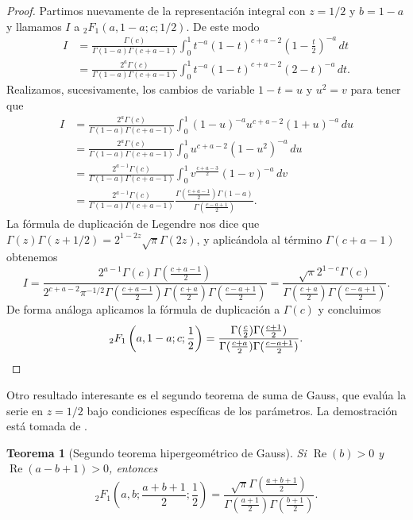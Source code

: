 \documentclass[12pt,a4paper]{book}
\renewcommand{\Re}{\operatorname{Re}}
\newtheorem{theorem}{Teorema}
\begin{document}
\begin{proof}
Partimos nuevamente de la representación integral con $z=1/2$ y $b=1-a$ y llamamos $I$ a ${}_{2}F_{1}(a,1-a;c;1/2)$. De este modo
\begin{align*}
   I &= 
   \frac{\Gamma(c)}{\Gamma(1-a)\Gamma(c+a-1)} \int_0^1 t^{-a} (1-t)^{c+a-2} \left(1-\frac{t}{2}\right)^{-a} \, dt \\ 
   &= \frac{2^a \Gamma(c)}{\Gamma(1-a)\Gamma(c+a-1)}\int_0^1 t^{-a} (1-t)^{c+a-2} (2-t)^{-a} \, dt.
\end{align*}
Realizamos, sucesivamente, los cambios de variable $1 - t = u$ y $u^2 = v$ para tener que 
\begin{align*}
   I &= 
   \frac{2^a \Gamma(c)}{\Gamma(1-a)\Gamma(c+a-1)} \int_0^1 (1-u)^{-a} u^{c+a-2} (1+u)^{-a} \, du \\ 
   &= \frac{2^a \Gamma(c)}{\Gamma(1-a)\Gamma(c+a-1)} \int_0^1 u^{c+a-2} (1-u^2)^{-a} \, du \\
   &= \frac{2^{a-1} \Gamma(c)}{\Gamma(1-a)\Gamma(c+a-1)} \int_0^1 v^{\frac{c+a-3}{2}} (1-v)^{-a} \, dv \\ 
   &= \frac{ 2^{a-1}\Gamma(c)}{\Gamma(1-a)\Gamma(c+a-1)} \frac{\Gamma(\frac{c+a-1}{2})\Gamma(1-a)}{\Gamma(\frac{c-a+1}{2})}.
\end{align*}
La fórmula de duplicación de Legendre nos dice que $\Gamma(z)\Gamma(z+1/2) = 2^{1-2z}\sqrt{\pi}\Gamma(2z)$, y aplicándola al término $\Gamma(c+a-1)$ obtenemos
\[ 
I = \frac{2^{a-1}\Gamma(c)\Gamma(\frac{c+a-1}{2})}{2^{c+a-2} \pi^{-1/2} \Gamma(\frac{c+a-1}{2})\Gamma(\frac{c+a}{2})\Gamma(\frac{c-a+1}{2})} = \frac{\sqrt{\pi} 2^{1-c} \Gamma(c)}{\Gamma(\frac{c+a}{2})\Gamma(\frac{c-a+1}{2})}.
\]
De forma análoga aplicamos la fórmula de duplicación a $\Gamma(c)$ y concluimos
\[ 
{}_{2}F_{1}\left(a, 1-a; c; \frac{1}{2}\right) = \frac{\Gamma(\frac{c}{2})\Gamma(\frac{c+1}{2})}{\Gamma(\frac{c+a}{2})\Gamma(\frac{c-a+1}{2})}.
\qedhere
\]
\end{proof}

Otro resultado interesante es el segundo teorema de suma de Gauss, que evalúa la serie en $z=1/2$ bajo condiciones específicas de los parámetros. La demostración está tomada de \cite{choi2007}.

\begin{theorem}[Segundo teorema hipergeométrico de Gauss]
\label{teo:gauss_segundo}
Si $\Re(b) > 0$ y $\Re(a-b+1) > 0$, entonces
\[
{}_{2}F_{1}\left(a, b; \frac{a+b+1}{2}; \frac{1}{2}\right) = \frac{\sqrt{\pi} \Gamma(\frac{a+b+1}{2})}{\Gamma(\frac{a+1}{2})\Gamma(\frac{b+1}{2})}.
\]
\end{theorem}
\end{document}
